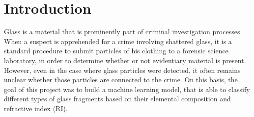 \section{Introduction}
Glass is a material that is prominently part of criminal investigation processes. When a suspect is apprehended for a crime involving shattered glass, it is a standard procedure to submit particles of his clothing to a forensic science laboratory, in order to determine whether or not evidentiary material is present. However, even in the case where glass particles were detected, it often remains unclear whether those particles are connected to the crime. On this basis, the goal of this project was to build a machine learning model, that is able to classify different types of glass fragments based on their elemental composition and refractive index (RI). 


